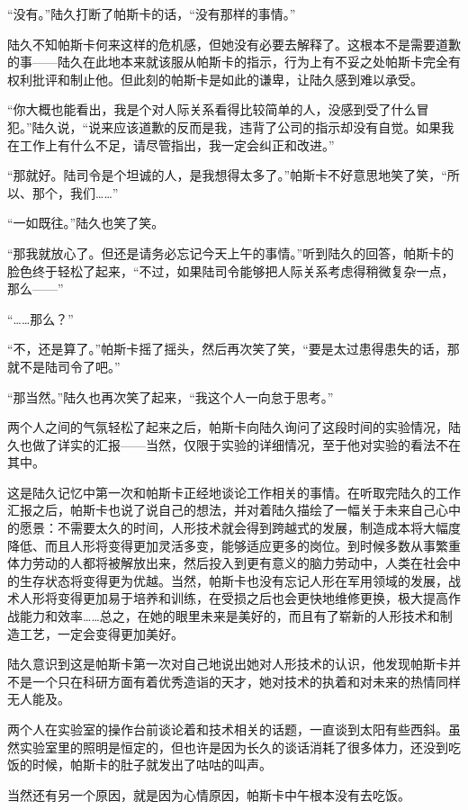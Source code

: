 “没有。”陆久打断了帕斯卡的话，“没有那样的事情。”

陆久不知帕斯卡何来这样的危机感，但她没有必要去解释了。这根本不是需要道歉的事——陆久在此地本来就该服从帕斯卡的指示，行为上有不妥之处帕斯卡完全有权利批评和制止他。但此刻的帕斯卡是如此的谦卑，让陆久感到难以承受。

“你大概也能看出，我是个对人际关系看得比较简单的人，没感到受了什么冒犯。”陆久说，“说来应该道歉的反而是我，违背了公司的指示却没有自觉。如果我在工作上有什么不足，请尽管指出，我一定会纠正和改进。”

“那就好。陆司令是个坦诚的人，是我想得太多了。”帕斯卡不好意思地笑了笑，“所以、那个，我们……”

“一如既往。”陆久也笑了笑。

“那我就放心了。但还是请务必忘记今天上午的事情。”听到陆久的回答，帕斯卡的脸色终于轻松了起来，“不过，如果陆司令能够把人际关系考虑得稍微复杂一点，那么——”

“……那么？”

“不，还是算了。”帕斯卡摇了摇头，然后再次笑了笑，“要是太过患得患失的话，那就不是陆司令了吧。”

“那当然。”陆久也再次笑了起来，“我这个人一向怠于思考。”

两个人之间的气氛轻松了起来之后，帕斯卡向陆久询问了这段时间的实验情况，陆久也做了详实的汇报——当然，仅限于实验的详细情况，至于他对实验的看法不在其中。

这是陆久记忆中第一次和帕斯卡正经地谈论工作相关的事情。在听取完陆久的工作汇报之后，帕斯卡也说了说自己的想法，并对着陆久描绘了一幅关于未来自己心中的愿景：不需要太久的时间，人形技术就会得到跨越式的发展，制造成本将大幅度降低、而且人形将变得更加灵活多变，能够适应更多的岗位。到时候多数从事繁重体力劳动的人都将被解放出来，然后投入到更有意义的脑力劳动中，人类在社会中的生存状态将变得更为优越。当然，帕斯卡也没有忘记人形在军用领域的发展，战术人形将变得更加易于培养和训练，在受损之后也会更快地维修更换，极大提高作战能力和效率……总之，在她的眼里未来是美好的，而且有了崭新的人形技术和制造工艺，一定会变得更加美好。

陆久意识到这是帕斯卡第一次对自己地说出她对人形技术的认识，他发现帕斯卡并不是一个只在科研方面有着优秀造诣的天才，她对技术的执着和对未来的热情同样无人能及。

两个人在实验室的操作台前谈论着和技术相关的话题，一直谈到太阳有些西斜。虽然实验室里的照明是恒定的，但也许是因为长久的谈话消耗了很多体力，还没到吃饭的时候，帕斯卡的肚子就发出了咕咕的叫声。

当然还有另一个原因，就是因为心情原因，帕斯卡中午根本没有去吃饭。

